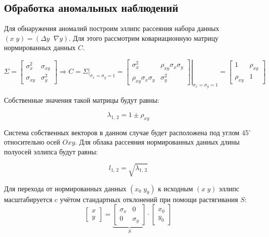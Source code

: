 \subsection{Обработка аномальных наблюдений}

Для обнаружения аномалий построим эллипс рассеяния набора данных $\left(x\;y\right)=\left( \Delta y\;\;\nabla y \right)$. Для этого рассмотрим ковариационную матрицу нормированных данных $C$.

\begin{equation*}
	\Sigma = \begin{bmatrix}
		\sigma_x ^ 2 & \sigma_{xy} \\ 
		\sigma_{xy} & \sigma_y ^ 2
	\end{bmatrix} \Rightarrow
	C = \left. \Sigma \right|_{\sigma_x = \sigma_y = 1} = \left.\begin{bmatrix}
		\sigma_x^2 & \rho_{xy} \sigma_x \sigma_y \\
		\rho_{xy} \sigma_x \sigma_y & \sigma_y^2
	\end{bmatrix} \right|_{\sigma_x = \sigma_y = 1} = \begin{bmatrix}
		1 & \rho_{xy} \\
		\rho_{xy} & 1
	\end{bmatrix}
\end{equation*}

Собственные значения такой матрицы будут равны:

\begin{equation}
	\lambda_{1,\,2} = 1 \pm \rho_{xy}
\end{equation}

Система собственных векторов в данном случае будет расположена под углом 45$^\circ$ относительно осей $Oxy$. Для облака рассеяния нормированных данных длины полуосей эллипса будут равны:

\begin{equation}
	l_{1,\,2} = \sqrt{\lambda_{1,\,2}}
\end{equation}

Для перехода от нормированных данных $(x_0\;y_0)$ к исходным $(x\;y)$ эллипс масштабируется c учётом стандартных отклонений при помощи растягивания $S$:
\begin{equation}
	\begin{bmatrix}
		x \\ y
	\end{bmatrix} = \underbrace{\begin{bmatrix}
		\sigma_x & 0 \\ 0 & \sigma_y
	\end{bmatrix}}_{S} \cdot \begin{bmatrix}
		x_0 \\ y_0
	\end{bmatrix}
\end{equation}


